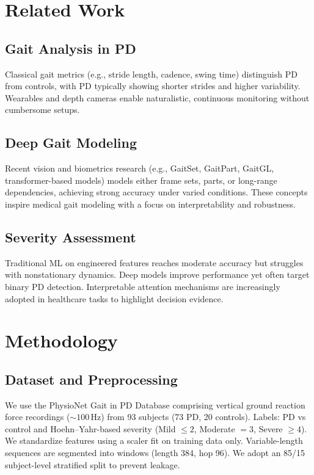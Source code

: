 \documentclass[conference]{IEEEtran}
\begin{document}
\section{Related Work}
\subsection{Gait Analysis in PD}
Classical gait metrics (e.g., stride length, cadence, swing time) distinguish PD from controls, with PD typically showing shorter strides and higher variability. Wearables and depth cameras enable naturalistic, continuous monitoring without cumbersome setups.

\subsection{Deep Gait Modeling}
Recent vision and biometrics research (e.g., GaitSet, GaitPart, GaitGL, transformer-based models) models either frame sets, parts, or long-range dependencies, achieving strong accuracy under varied conditions. These concepts inspire medical gait modeling with a focus on interpretability and robustness.

\subsection{Severity Assessment}
Traditional ML on engineered features reaches moderate accuracy but struggles with nonstationary dynamics. Deep models improve performance yet often target binary PD detection. Interpretable attention mechanisms are increasingly adopted in healthcare tasks to highlight decision evidence.

\section{Methodology}
\subsection{Dataset and Preprocessing}
We use the PhysioNet Gait in PD Database comprising vertical ground reaction force recordings (\(\sim100\,\mathrm{Hz}\)) from 93 subjects (73 PD, 20 controls). Labels: PD vs control and Hoehn--Yahr-based severity (Mild \(\leq 2\), Moderate $=3$, Severe \(\geq 4\)). We standardize features using a scaler fit on training data only. Variable-length sequences are segmented into windows (length 384, hop 96). We adopt an 85/15 subject-level stratified split to prevent leakage.
\end{document}
